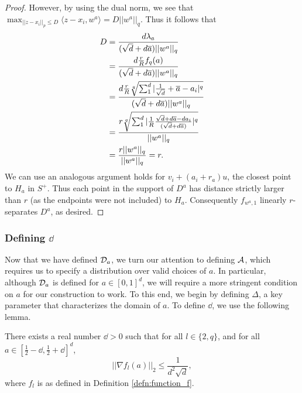 \begin{proof}
However, by using the dual norm, we see that $\max_{||z - x_i||_p \leq D} \langle z - x_i, w^a \rangle = D||w^a||_q$. Thus it follows that
\begin{equation*}
\begin{split}
D &= \frac{d\lambda_a}{(\sqrt{d} + d\overline{a})||w^a||_q} \\
&= \frac{d\frac{r}{R}f_q(a)}{(\sqrt{d} + d\overline{a})||w^a||_q} \\
&= \frac{d\frac{r}{R}\sqrt[q]{\sum_1^d |\frac{1}{\sqrt{d}} + \overline{a} - a_i|^q}}{(\sqrt{d} + d\overline{a})||w^a||_q} \\
&= \frac{r\sqrt[q]{\sum_1^d |\frac{1}{R}\frac{\sqrt{d} + d\overline{a} - da_i}{(\sqrt{d} + d\overline{a})}|^q}}{||w^a||_q} \\
&= \frac{r||w^a||_q}{||w^a||_q} = r.
\end{split}
\end{equation*}
We can use an analogous argument holds for $v_i + (a_i + r_a)u$, the closest point to $H_a$ in $S^+$. Thus each point in the support of $D^a$ has distance strictly larger than $r$ (as the endpoints were not included) to $H_a$. Consequently $f_{w^a, 1}$ linearly $r$-separates $D^a$, as desired. 
\end{proof}

\subsubsection{Defining $\dd$}\label{subsubsec:dd}

Now that we have defined ${\mathcal D}_a$, we turn our attention to defining $\mathcal{A}$, which requires us to specify a distribution over valid choices of $a$. In particular, although ${\mathcal D}_a$ is defined for $a \in [0, 1]^d$, we will require a more stringent condition on $a$ for our construction to work. To this end, we begin by defining $\Delta$, a key parameter that characterizes the domain of $a$. To define $\dd$, we use the following lemma.

\begin{lem}\label{lem:dd}
There exists a real number $\dd > 0$ such that for all $l \in \{2, q\}$, and for all $a \in [\frac{1}{2} - \dd, \frac{1}{2} + \dd]^d$, $$||\nabla f_l(a)||_2 \leq \frac{1}{d^2\sqrt{d}},$$ where $f_l$ is as defined in Definition \ref{defn:function_f}.
\end{lem}

